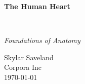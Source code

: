 \clearpage
\vspace*{1.5in}
\begin{center}
  \begin{minipage}{\textwidth}
    \centering
    \Huge\bfseries
    \linespread{1.25}\selectfont
  The Human Heart
  \end{minipage}
  \\[3em]
  {\Large\itshape\linespread{1.3}\selectfont
  Foundations of Anatomy\par}
  \vfill
  {\large Skylar Saveland}
  \\[1em]
  {\large Corpora Inc}
  \\[1em]
  {\large \today}
\end{center}
\clearpage
